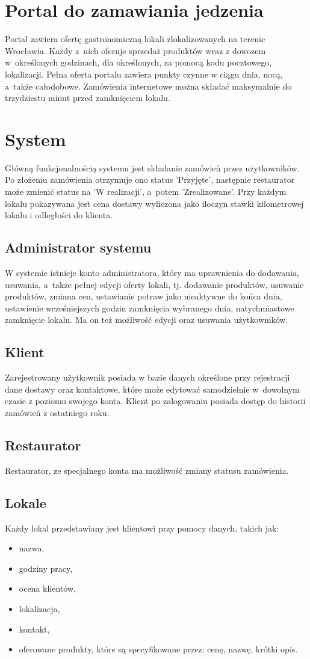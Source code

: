 \documentclass[12pt, a4paper, oneside]{article}
\begin{document}
\section{Portal do zamawiania jedzenia}
\indent\indent Portal zawiera ofertę gastronomiczną lokali zlokalizowanych na terenie Wrocławia. Każdy z~nich oferuje sprzedaż produktów wraz z dowozem w~określonych godzinach, dla określonych, za pomocą kodu pocztowego, lokalizacji. Pełna oferta portalu zawiera punkty czynne w ciągu dnia, nocą, a~także całodobowe. Zamówienia internetowe można składać maksymalnie do trzydziestu minut przed zamknięciem lokalu.
\section{System}
\indent\indent Główną funkcjonalnością systemu jest składanie zamówień przez użytkowników. Po złożeniu zamówienia otrzymuje ono status 'Przyjęte', następnie restaurator może zmienić status na 'W realizacji', a~potem 'Zrealizowane'. Przy każdym lokalu pokazywana jest cena dostawy wyliczona jako iloczyn stawki kilometrowej lokalu i odległości do klienta.
\subsection{Administrator systemu}
\indent\indent W systemie istnieje konto administratora, który ma uprawnienia do dodawania, usuwania, a~także pełnej edycji oferty lokali, tj. dodawanie produktów, usuwanie produktów, zmiana cen, ustawianie potraw jako nieaktywne do końca dnia, ustawienie wcześniejszych godzin zamknięcia wybranego dnia, natychmiastowe zamknięcie lokalu. Ma on też możliwość edycji oraz usuwania użytkowników.
\subsection{Klient}
\indent\indent Zarejestrowany użytkownik posiada w bazie danych określone przy rejestracji dane dostawy oraz kontaktowe, które może edytować samodzielnie w~dowolnym czasie z poziomu swojego konta. Klient po zalogowaniu posiada dostęp do historii zamówień z ostatniego roku.
\subsection{Restaurator}
\indent\indent Restaurator, ze specjalnego konta ma możliwość zmiany statusu zamówienia.
\subsection{Lokale}
\indent\indent Każdy lokal przedstawiany jest klientowi przy pomocy danych, takich jak:
\begin{itemize}
\item nazwa,
\item godziny pracy,
\item ocena klientów,
\item lokalizacja,
\item kontakt,
\item oferowane produkty, które są specyfikowane przez: cenę, nazwę, krótki opis.
\end{itemize}
\end{document}
